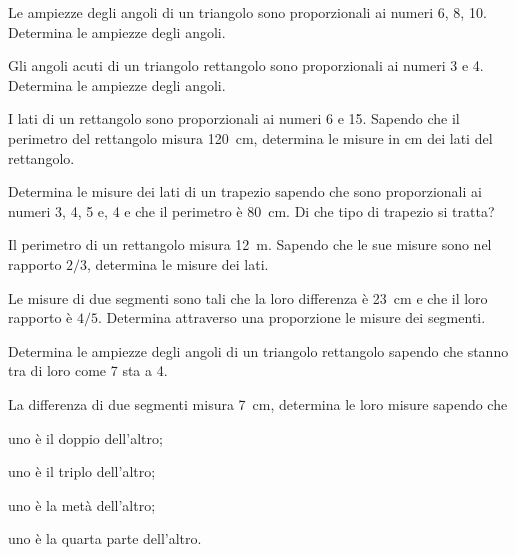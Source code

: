 \begin{multicols}{2}
\begin{esercizio}
\label{ese:6.21}
Le ampiezze degli angoli di un triangolo sono proporzionali ai numeri 
6, 8, 10. Determina le ampiezze degli angoli.
\end{esercizio}

\begin{esercizio}
\label{ese:6.22}
Gli angoli acuti di un triangolo rettangolo sono proporzionali ai 
numeri 3 e 4. Determina le ampiezze degli angoli.
\end{esercizio}

\begin{esercizio}
\label{ese:6.23}
I lati di un rettangolo sono proporzionali ai numeri 6 e 15. Sapendo 
che il perimetro del rettangolo misura 120~cm, determina le misure in 
cm dei lati del rettangolo.
\end{esercizio}

\begin{esercizio}
\label{ese:6.24}
Determina le misure dei lati di un trapezio sapendo che sono 
proporzionali ai numeri 3, 4, 5 e, 4 e che il perimetro è 80~cm. Di 
che tipo di trapezio si tratta?
\end{esercizio}

\begin{esercizio}
\label{ese:6.25}
Il perimetro di un rettangolo misura 12~m. Sapendo che le sue misure 
sono nel rapporto $2/3$, determina le misure dei lati.
\end{esercizio}

\begin{esercizio}
\label{ese:6.26}
Le misure di due segmenti sono tali che la loro differenza è 23~cm e 
che il loro rapporto è $4/5$. Determina attraverso una proporzione le 
misure dei segmenti. 
\end{esercizio}

\begin{esercizio}
\label{ese:6.27}
Determina le ampiezze degli angoli di un triangolo rettangolo sapendo 
che stanno tra di loro come 7 sta a 4.
\end{esercizio}

\begin{esercizio}
\label{ese:6.28}
La differenza di due segmenti misura 7~cm, determina le loro misure 
sapendo che
\begin{enumeratea}
\item uno è il doppio dell'altro;
\item uno è il triplo dell'altro;
\item uno è la metà dell'altro;
\item uno è la quarta parte dell'altro.
\end{enumeratea}
\end{esercizio}


\end{multicols}
